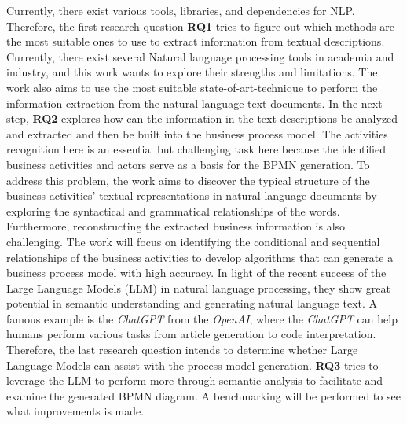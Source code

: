 	
	Currently, there exist various tools, libraries, and dependencies for NLP. Therefore, the first research question \textbf{RQ1} tries to figure out which methods are the most suitable ones to use to extract information from textual descriptions. Currently, there exist several Natural language processing tools in academia and industry, and this work wants to explore their strengths and limitations. The work also aims to use the most suitable state-of-art-technique to perform the information extraction from the natural language text documents. 
	In the next step, \textbf{RQ2} explores how can the information in the text descriptions be analyzed and extracted and then be built into the business process model. The activities recognition here is an essential but challenging task here because the identified business activities and actors serve as a basis for the BPMN generation. To address this problem, the work aims to discover the typical structure of the business activities' textual representations in natural language documents by exploring the syntactical and grammatical relationships of the words. Furthermore, reconstructing the extracted business information is also challenging. The work will focus on identifying the conditional and sequential relationships of the business activities to develop algorithms that can generate a business process model with high accuracy.
	In light of the recent success of the Large Language Models (LLM) in natural language processing, they show great potential in semantic understanding and generating natural language text. A famous example is the \textit{ChatGPT} from the \textit{OpenAI}, where the \textit{ChatGPT} can help humans perform various tasks from article generation to code interpretation. Therefore, the last research question intends to determine whether Large Language Models can assist with the process model generation. \textbf{RQ3} tries to leverage the LLM to perform more through semantic analysis to facilitate and examine the generated BPMN diagram. A benchmarking will be performed to see what improvements is made.

	
	
	
	


